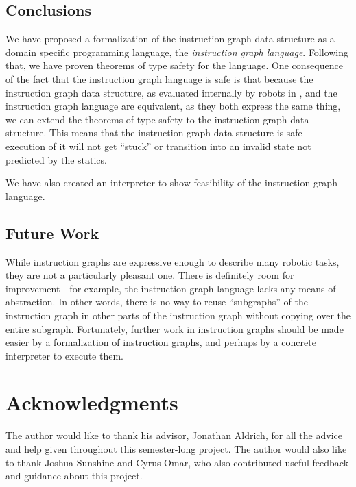 \documentclass{sig-alternate-05-2015}
\begin{document}
\subsection{Conclusions}

We have proposed a formalization of the instruction graph data structure as a
domain specific programming language, the \textit{instruction graph language}.
Following that, we have proven theorems of type safety for the language. One
consequence of the fact that the instruction graph language is safe is that
because the instruction graph data structure, as evaluated internally by robots
in \cite{veloso:instructiongraphs}, and the instruction graph language are
equivalent, as they both express the same thing, we can extend the theorems of
type safety to the instruction graph data structure. This means that the
instruction graph data structure is safe - execution of it will not get
``stuck'' or transition into an invalid state not predicted by the statics.

We have also created an interpreter to show feasibility of the instruction graph
language.

\subsection{Future Work}

While instruction graphs are expressive enough to describe many robotic tasks,
they are not a particularly pleasant one. There is definitely room for
improvement - for example, the instruction graph language lacks any means of
abstraction. In other words, there is no way to reuse ``subgraphs'' of the
instruction graph in other parts of the instruction graph without copying over
the entire subgraph. Fortunately, further work in instruction graphs should be
made easier by a formalization of instruction graphs, and perhaps by a concrete
interpreter to execute them.

\section{Acknowledgments}
The author would like to thank his advisor, Jonathan Aldrich, for all the advice
and help given throughout this semester-long project. The author would also like
to thank Joshua Sunshine and Cyrus Omar, who also contributed useful feedback
and guidance about this project.

%

%
%
\end{document}
